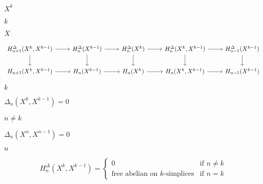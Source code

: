 \documentclass[10pt]{book}
\begin{document}
\begin{mdSnippets}
\begin{mdInlineSnippet}[fd221a37cf78ff3720cc2612be61dc45]
$X^k$\end{mdInlineSnippet}%
\begin{mdInlineSnippet}[8ce4b16b22b58894aa86c421e8759df3]%
$k$\end{mdInlineSnippet}%
\begin{mdInlineSnippet}[02129bb861061d1a052c592e2dc6b383]%
$X$\end{mdInlineSnippet}%
\begin{mdDisplaySnippet}[51813dbe833d5b1e97f128ea9793d26f]%
\[%
\begin{tikzcd}
  H_{n+1}^\Delta(X^k, X^{k-1}) \arrow[r] \arrow[d] &
  H_n^\Delta(X^{k-1}) \arrow[r] \arrow[d] &
  H_n^\Delta(X^k) \arrow[r] \arrow[d] &
  H_n^\Delta(X^k, X^{k-1}) \arrow[r] \arrow[d] &
  H_{n-1}^\Delta(X^{k-1}) \arrow[d] \\
  H_{n+1}(X^k, X^{k-1}) \arrow[r] &
  H_n(X^{k-1}) \arrow[r] &
  H_n(X^k) \arrow[r] &
  H_n(X^k, X^{k-1}) \arrow[r] &
  H_{n-1}(X^{k-1})
\end{tikzcd}
\]%
\end{mdDisplaySnippet}%
\begin{mdInlineSnippet}[8ce4b16b22b58894aa86c421e8759df3]%
$k$\end{mdInlineSnippet}%
\begin{mdInlineSnippet}[c6642b331f31d8bf7d7a4956eadabe90]%
$\Delta_n(X^k, X^{k-1}) = 0$\end{mdInlineSnippet}%
\begin{mdInlineSnippet}[7806ed6b650e3b71b87023e03538821d]%
$n \ne k$\end{mdInlineSnippet}%
\begin{mdInlineSnippet}%
$\Delta_n(X^n, X^{n-1}) = 0$\end{mdInlineSnippet}%
\begin{mdInlineSnippet}[7b8b965ad4bca0e41ab51de7b31363a1]%
$n$\end{mdInlineSnippet}%
\begin{mdDisplaySnippet}%
\[%
H_n^\Delta(X^k, X^{k-1}) = \begin{cases}
  0 & \text{if } n \ne k \\
  \text{free abelian on $k$-simplices} & \text{if } n = k
\end{cases}
\]
\end{mdDisplaySnippet}
\end{mdSnippets}
\end{document}
